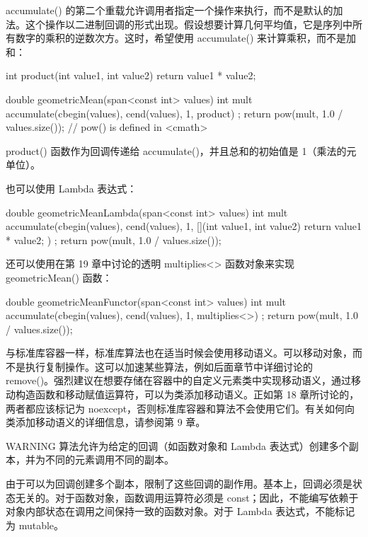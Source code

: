 accumulate() 的第二个重载允许调用者指定一个操作来执行，而不是默认的加法。这个操作以二进制回调的形式出现。假设想要计算几何平均值，它是序列中所有数字的乘积的逆数次方。这时，希望使用 accumulate() 来计算乘积，而不是加和：

\begin{cpp}
int product(int value1, int value2) { return value1 * value2; }

double geometricMean(span<const int> values)
{
    int mult { accumulate(cbegin(values), cend(values), 1, product) };
    return pow(mult, 1.0 / values.size()); // pow() is defined in <cmath>
}
\end{cpp}

product() 函数作为回调传递给 accumulate()，并且总和的初始值是 1（乘法的元单位）。

也可以使用 Lambda 表达式：

\begin{cpp}
double geometricMeanLambda(span<const int> values)
{
    int mult { accumulate(cbegin(values), cend(values), 1,
        [](int value1, int value2) { return value1 * value2; }) };
    return pow(mult, 1.0 / values.size());
}
\end{cpp}

还可以使用在第 19 章中讨论的透明 multiplies<> 函数对象来实现 geometricMean() 函数：

\begin{cpp}
double geometricMeanFunctor(span<const int> values)
{
    int mult { accumulate(cbegin(values), cend(values), 1, multiplies<>{}) };
    return pow(mult, 1.0 / values.size());
}
\end{cpp}


与标准库容器一样，标准库算法也在适当时候会使用移动语义。可以移动对象，而不是执行复制操作。这可以加速某些算法，例如后面章节中详细讨论的 remove()。强烈建议在想要存储在容器中的自定义元素类中实现移动语义，通过移动构造函数和移动赋值运算符，可以为类添加移动语义。正如第 18 章所讨论的，两者都应该标记为 noexcept，否则标准库容器和算法不会使用它们。有关如何向类添加移动语义的详细信息，请参阅第 9 章。


\begin{myWarning}{WARNING}
算法允许为给定的回调（如函数对象和 Lambda 表达式）创建多个副本，并为不同的元素调用不同的副本。
\end{myWarning}

由于可以为回调创建多个副本，限制了这些回调的副作用。基本上，回调必须是状态无关的。对于函数对象，函数调用运算符必须是 const；因此，不能编写依赖于对象内部状态在调用之间保持一致的函数对象。对于 Lambda 表达式，不能标记为 mutable。

